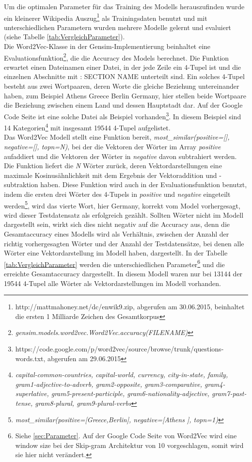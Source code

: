 \documentclass[12pt,a4paper]{report}
\begin{document}
Um die optimalen Parameter für das Training des Modells herauszufinden wurde ein kleinerer Wikipedia Auszug\footnote{http://mattmahoney.net/dc/enwik9.zip, abgerufen am 30.06.2015, beinhaltet die ersten 1 Milliarde Zeichen des Gesamtkorpus} als Trainingsdaten benutzt und mit unterschiedlichen Parametern wurden mehrere Modelle gelernt und evaluiert (siehe Tabelle \ref{tab:VergleichParameter}).\\
Die Word2Vec-Klasse in der Gensim-Implementierung beinhaltet eine Evaluationsfunktion\footnote{\textit{gensim.models.word2vec.Word2Vec.accuracy(FILENAME)}}, die die Accuracy des Models berechnet. Die Funktion erwartet einen Dateinamen einer Datei, in der jede Zeile ein 4-Tupel ist und die einzelnen Abschnitte mit \glqq : SECTION NAME\grqq{} unterteilt sind. Ein solches 4-Tupel besteht aus zwei Wortpaaren, deren Worte die gleiche Beziehung untereinander haben, zum Beispiel \glqq Athens Greece Berlin Germany\grqq , hier stellen beide Wortpaare die Beziehung zwischen einem Land und dessen Hauptstadt dar. Auf der Google Code Seite ist eine solche Datei als Beispiel vorhanden\footnote{https://code.google.com/p/word2vec/source/browse/trunk/questions-words.txt, abgerufen am 29.06.2015}. In diesem Beispiel sind 14 Kategorien\footnote{\textit{capital-common-countries, capital-world, currency, city-in-state, family, gram1-adjective-to-adverb, gram2-opposite, gram3-comparative, gram4-superlative, gram5-present-participle, gram6-nationality-adjective, gram7-past-tense, gram8-plural, gram9-plural-verbs}} mit insgesamt 19544 4-Tupel aufgelistet.\\
Das Word2Vec Modell stellt eine Funktion bereit, \textit{most\_similar(positive=[], negative=[], topn=N)}, bei der die Vektoren der Wörter im Array \textit{positive} aufaddiert und die Vektoren der Wörter in \textit{negative} davon subtrahiert werden. Die Funktion liefert die \textit{N} Wörter zurück, deren Vektordarstellungen eine maximale Kosinusähnlichkeit mit dem Ergebnis der Vektoraddition und -subtraktion haben. Diese Funktion wird auch in der Evaluationsfunktion benutzt, indem die ersten drei Wörter des 4-Tupels in \textit{positive} und \textit{negative} eingeteilt werden\footnote{\textit{most\_similar(positive=[\grq Greece\grq,\grq Berlin\grq], negative=[\grq Athens \grq], topn=1)}}, wird das vierte Wort, hier \glq Germany\grq, korrekt vom Model vorhergesagt, wird dieser Testdatensatz als erfolgreich gezählt. Sollten Wörter nicht im Modell dargestellt sein, wirkt sich dies nicht negativ auf die Accuracy aus, denn die Gesamtaccuracy eines Modells wird als Verhältnis, zwischen der Anzahl der richtig vorhergesagten Wörter und der Anzahl der Testdatensätze, bei denen alle Wörter eine Vektordarstellung im Modell haben, dargestellt. In der Tabelle \ref{tab:VergleichParameter} werden die unterschiedlichen Parameter\footnote{Siehe \ref{sec:Parameter}. Auf der Google Code Seite von Word2Vec wird eine window size bei der Skip-gram Architektur von 10 vorgeschlagen, somit wird sie hier nicht verändert.} und die erreichte Gesamtaccuracy dargestellt. In diesem Modell waren nur bei 13144 der 19544 4-Tupel alle Wörter als Vektordarstellungen im Modell vorhanden.
\end{document}
